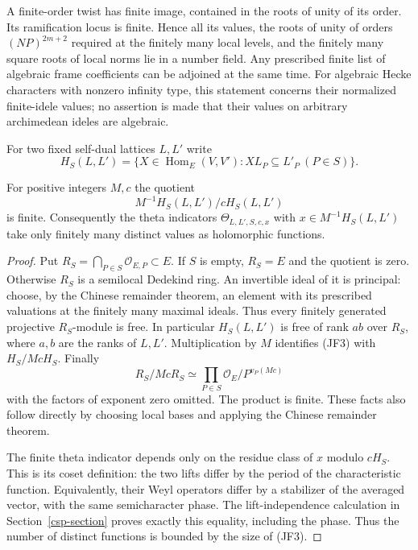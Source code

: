 A finite-order twist has finite image, contained in the roots
of unity of its order. Its ramification locus is finite.
Hence all its values, the roots of unity of orders
$(NP)^{2m+2}$ required at the finitely many local levels, and
the finitely many square roots of local norms lie in a number
field. Any prescribed finite list of algebraic frame
coefficients can be adjoined at the same time.
For algebraic Hecke characters with nonzero infinity type,
this statement concerns their normalized finite-idele
values; no assertion is made that their values on arbitrary
archimedean ideles are algebraic.

For two fixed self-dual lattices $L,L'$ write
\[
 H_S(L,L')=\{X\in\operatorname{Hom}_E(V,V'):
                         XL_P\subseteq L'_P\ (P\in S)\}.
\]

\begin{lemma}\label{jcf-finite-indicators}
For positive integers $M,c$ the quotient
\[
                  M^{-1}H_S(L,L')/cH_S(L,L')              \tag{JF3}
\]
is finite. Consequently the theta indicators
$\Theta_{L,L',S,c,x}$ with $x\in M^{-1}H_S(L,L')$ take
only finitely many distinct values as holomorphic functions.
\end{lemma}
\begin{proof}
Put $R_S=\bigcap_{P\in S}\mathcal O_{E,P}\subset E$.
If $S$ is empty, $R_S=E$ and the quotient is zero.
Otherwise $R_S$ is a semilocal Dedekind ring. An invertible
ideal of it is principal: choose, by the Chinese remainder
theorem, an element with its prescribed valuations at the
finitely many maximal ideals. Thus every finitely generated
projective $R_S$-module is free. In particular $H_S(L,L')$
is free of rank $ab$ over $R_S$, where $a,b$ are the ranks
of $L,L'$. Multiplication by $M$ identifies (JF3) with
$H_S/McH_S$. Finally
\[
 R_S/McR_S\simeq
     \prod_{P\in S}\mathcal O_E/P^{v_P(Mc)}
\]
with the factors of exponent zero omitted. The product is
finite. These facts also follow directly by choosing local
bases and applying the Chinese remainder theorem.

The finite theta indicator depends only on the residue class
of $x$ modulo $cH_S$. This is its coset definition: the two
lifts differ by the period of the characteristic function.
Equivalently, their Weyl operators differ by a stabilizer of
the averaged vector, with the same semicharacter phase. The
lift-independence calculation in Section~\ref{csp-section}
proves exactly this equality, including the phase. Thus the
number of distinct functions is bounded by the size of (JF3).
\end{proof}

